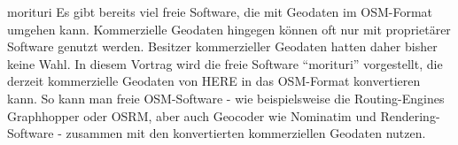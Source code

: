%
{morituri}%
{}%
{Es gibt bereits viel freie Software, die mit Geodaten im OSM-Format umgehen kann.
Kommerzielle Geodaten hingegen können oft nur mit proprietärer Software genutzt werden.
Besitzer kommerzieller Geodaten hatten daher bisher keine Wahl.
In diesem Vortrag wird die freie Software "`morituri"' vorgestellt, die derzeit kommerzielle Geodaten von HERE in das OSM-Format konvertieren kann.
So kann man freie OSM-Software - wie beispielsweise die Routing-Engines Graphhopper oder OSRM, aber auch Geocoder wie Nominatim und Rendering-Software - zusammen mit den konvertierten kommerziellen Geodaten nutzen.}

\newpage

\vfill
{}

\vfill

